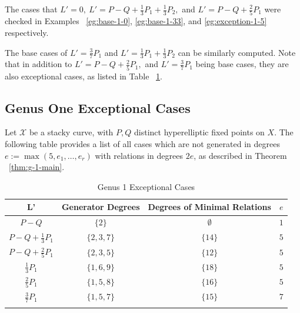 \documentclass{amsart}
\theoremstyle{plain}
\theoremstyle{definition}
\theoremstyle{remark}
\newtheorem{rem}[thm]{Remark}
\numberwithin{equation}{section}
\newcommand\ssec{\subsection}
\newcommand\sx{\mathscr X}
\begin{document}
The cases that $L' = 0, \: L' = P-Q +\frac{1}{3}P_1 + \frac{1}{3}P_2,$ and $L' = P-Q + \frac{2}{5}P_1$ were checked in Examples ~\ref{eg:base-1-0}, \ref{eg:base-1-33}, and \ref{eg:exception-1-5} respectively.

The base cases of $L' = \frac{3}{7}P_1$ and $L' = \frac{1}{3}P_1 +\frac{1}{3}P_2$ can be similarly computed. Note that in addition to $L' = P - Q + \frac{2}{5}P_1,$ and $L' = \frac{3}{7}P_1$ being base cases, they are also exceptional cases, as listed in Table ~\ref{table:g-1-exceptional}.

\ssec{Genus One Exceptional Cases}
\label{ssec:g-1-exceptional}
Let $\sx$ be a stacky curve, with $P, Q$ distinct hyperelliptic
fixed points on $X$. The following table provides a list of all
cases which are not generated in degrees $e := \max(5, e_1, \ldots,
e_r)$ with relations in degrees $2e$, as described in Theorem
~\ref{thm:g-1-main}.

\begin{longtable}	{| c || c | c | c |}
	\hline
	L' & Generator Degrees & Degrees of Minimal Relations & $e$ \\
	\hline
	\hline
	$P - Q$ & $\{2\}$ & $\emptyset$ & $1$\\	\hline

	$P - Q + \frac{1}{3} P_1$ & $\{2, 3, 7\}$ & $\{14\}$ & $5$ \\	\hline

	$P - Q + \frac{2}{5} P_1$ & $\{2, 3, 5\}$ & $\{12\}$ & $5$\\	\hline
	
	$\frac{1}{3} P_1$ & $\{1, 6, 9\}$ & $\{18\}$ & $5$ \\	\hline

	$\frac{2}{5} P_1$ & $\{1, 5, 8\}$ & $\{16\}$ & $5$ \\	\hline
	
	$\frac{3}{7} P_1$ & $\{1, 5, 7\}$ & $\{15\}$ & $7$ \\	\hline
	
	\caption{Genus 1 Exceptional Cases}
	\label{table:g-1-exceptional}
	
\end{longtable}

\end{document}
